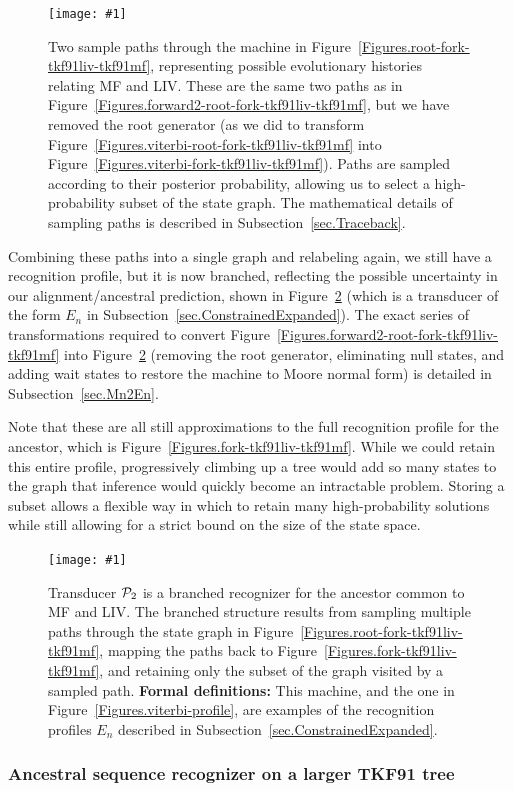\documentclass{article}
\newcommand{\secref}[1]{Subsection~\ref{sec.#1}}
\newcommand{\figref}[1]{Figure~\ref{Figures.#1}}
\newcommand{\figlabel}[1]{\label{Figures.#1}}
\newcommand{\easyfig}[4]{
\begin{figure}
\texttt{[image: \#1]}
\caption{ \figlabel{#3} #4}
\end{figure}}
\newcommand{\widepdffig}[2]{\easyfig{#1-fig.pdf}{width=\textwidth}{#1}{#2}}
\newcommand\profile{{\cal P}}
\newcommand\formaldefs{{\bf Formal definitions: }}
\begin{document}
\widepdffig{forward2-fork-tkf91liv-tkf91mf}{Two sample paths through the 
machine in \figref{root-fork-tkf91liv-tkf91mf}, representing
possible evolutionary histories relating MF and LIV.
These are the same two paths as in \figref{forward2-root-fork-tkf91liv-tkf91mf},
but we have removed the root generator (as we did to transform \figref{viterbi-root-fork-tkf91liv-tkf91mf} into \figref{viterbi-fork-tkf91liv-tkf91mf}).
Paths are sampled according to their posterior probability, 
allowing us to select a high-probability subset of the state graph.  
The mathematical details of sampling paths is described in \secref{Traceback}.}

Combining these paths into a single graph and relabeling again, 
we still have a recognition profile, but it is now branched,
reflecting the possible uncertainty in our alignment/ancestral prediction, shown in \figref{forward2-profile}
(which is a transducer of the form $E_n$ in \secref{ConstrainedExpanded}).
The exact series of transformations required to convert \figref{forward2-root-fork-tkf91liv-tkf91mf} into \figref{forward2-profile}
(removing the root generator, eliminating null states, and adding wait states to restore the machine to Moore normal form)
is detailed in \secref{Mn2En}.  

Note that these are all still approximations to the full
recognition profile for the ancestor, which is \figref{fork-tkf91liv-tkf91mf}.  
While we could retain this entire profile, progressively climbing up a tree
would add so many states to the graph that inference would quickly become an intractable
problem.  
Storing a subset allows a flexible way in which to retain many high-probability solutions
while still allowing for a strict bound on the size of the state space. 

\widepdffig{forward2-profile}{Transducer $\profile_2$ is a branched recognizer for the 
ancestor common to MF and LIV.  The branched structure results from sampling
multiple paths through the state graph in \figref{root-fork-tkf91liv-tkf91mf}, 
mapping the paths back to \figref{fork-tkf91liv-tkf91mf},
and retaining only the subset of the graph visited by a sampled path.
\formaldefs
This machine, and the one in \figref{viterbi-profile}, are examples of the recognition profiles $E_n$ described in \secref{ConstrainedExpanded}.  }

\subsubsection{Ancestral sequence recognizer on a larger TKF91 tree}
\end{document}
